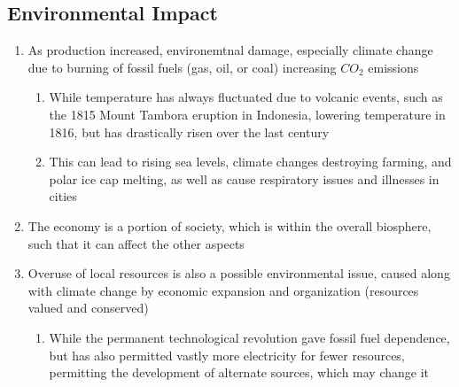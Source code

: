 \subsection{Environmental Impact}
\begin{enumerate}
\item As production increased, environemtnal damage, especially climate change due to burning of fossil fuels (gas, oil, or coal) increasing $CO_2$ emissions
\begin{enumerate}
\item While temperature has always fluctuated due to volcanic events, such as the 1815 Mount Tambora eruption in Indonesia, lowering temperature in 1816, but has drastically risen over the last century
\item This can lead to rising sea levels, climate changes destroying farming, and polar ice cap melting, as well as cause respiratory issues and illnesses in cities
\end{enumerate}
\item The economy is a portion of society, which is within the overall biosphere, such that it can affect the other aspects
\item Overuse of local resources is also a possible environmental issue, caused along with climate change by economic expansion and organization (resources valued and conserved)
\begin{enumerate}
\item While the permanent technological revolution gave fossil fuel dependence, but has also permitted vastly more electricity for fewer resources, permitting the development of alternate sources, which may change it
\end{enumerate}
\end{enumerate}

